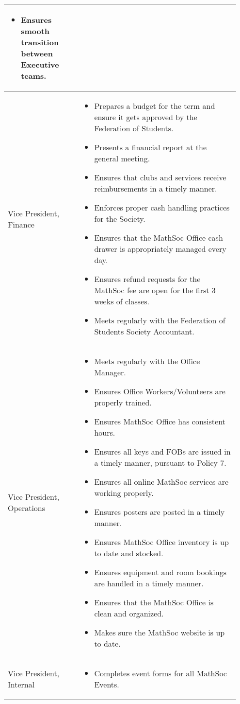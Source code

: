 \begin{longtable}{p{0.3\linewidth} p{0.65\linewidth}}
\begin{itemize}
\item Ensures smooth transition between Executive teams.
\end{itemize}
\\
\midrule
Vice President, Finance &
\begin{itemize}
\item Prepares a budget for the term and ensure it gets approved by the Federation of Students.
\item Presents a financial report at the general meeting.
\item Ensures that clubs and services receive reimbursements in a timely manner.
\item Enforces proper cash handling practices for the Society.
\item Ensures that the MathSoc Office cash drawer is appropriately managed every day.
\item Ensures refund requests for the MathSoc fee are open for the first 3 weeks of classes.
\item Meets regularly with the Federation of Students Society Accountant.
\end{itemize}
\\
\midrule
Vice President, Operations & 
\begin{itemize}
\item Meets regularly with the Office Manager.
\item Ensures Office Workers/Volunteers are properly trained.
\item Ensures MathSoc Office has consistent hours.
\item Ensures all keys and FOBs are issued in a timely manner, pursuant to
Policy 7.
\item Ensures all online MathSoc services are working properly.
\item Ensures posters are posted in a timely manner.
\item Ensures MathSoc Office inventory is up to date and stocked.
\item Ensures equipment and room bookings are handled in a timely
manner.
\item Ensures that the MathSoc Office is clean and organized.
\item Makes sure the MathSoc website is up to date.
\end{itemize}
\\
\midrule
Vice President, Internal & 
\begin{itemize}
\item Completes event forms for all MathSoc Events.

\end{itemize}
\end{longtable}
